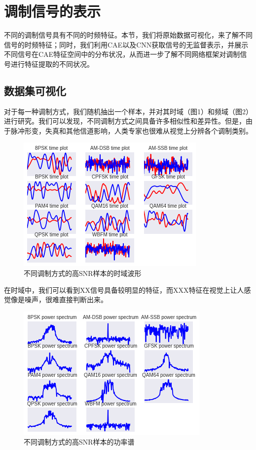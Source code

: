 \section{调制信号的表示}

不同的调制信号具有不同的时频特征。本节，我们将原始数据可视化，来了解不同信号的时频特征；同时，我们利用CAE以及CNN获取信号的无监督表示，并展示不同信号在CAE特征空间中的分布状况，从而进一步了解不同网络框架对调制信号进行特征提取的不同状况。

\subsection{数据集可视化}

对于每一种调制方式，我们随机抽出一个样本，并对其时域（图1）和频域（图2）进行研究。我们可以发现，不同调制方式之间具备许多相似性和差异性。但是，由于脉冲形变，失真和其他信道影响，人类专家也很难从视觉上分辨各个调制类别。\par

\begin{figure}[!h]
	\centering
	\includegraphics[scale=0.9]{figures/chapter_3/signal_view_1}
	\caption{不同调制方式的高SNR样本的时域波形}\label{fig_3_2}
\end{figure}

在时域中，我们可以看到XX信号具备较明显的特征，而XXX特征在视觉上让人感觉像是噪声，很难直接判断出来。\par

\begin{figure}[!h]
	\centering
	\includegraphics[scale=0.9]{figures/chapter_3/signal_view_2}
	\caption{不同调制方式的高SNR样本的功率谱}\label{fig_3_3}
\end{figure}

